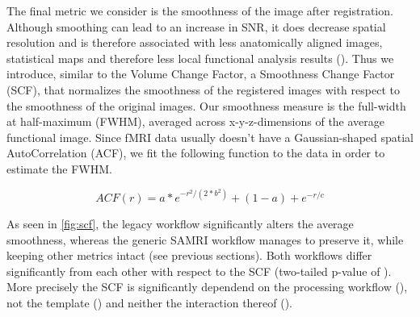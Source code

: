 The final metric we consider is the smoothness of the image after registration. 
Although smoothing can lead to an increase in SNR, it does decrease spatial resolution and is therefore associated with less anatomically aligned images, statistical maps and therefore less local functional analysis results (\cite{esteban2018fmriprep}). 
Thus we introduce, similar to the Volume Change Factor, a Smoothness Change Factor (SCF), that normalizes the smoothness of the registered images with respect to the smoothness of the original images. 
Our smoothness measure is the full-width at half-maximum (FWHM), averaged across x-y-z-dimensions of the average functional image. 
Since fMRI data usually doesn't have a Gaussian-shaped spatial AutoCorrelation (ACF), we fit the following function to the data in order to estimate the FWHM.

\begin{equation} \label{eq:acf}
        ACF(r)
        = a * e^{ -r^{2}/ (2 * b^{2}) } + (1 - a) + e^{-r/c}
\end{equation}

\begin{sansmath}
\end{sansmath}

As seen in \cref{fig:scf}, the legacy workflow significantly alters the average smoothness, whereas the generic SAMRI workflow manages to preserve it, while keeping other metrics intact (see previous sections). 
Both workflows differ significantly from each other with respect to the SCF (two-tailed p-value of ). 
More precisely the SCF is significantly dependend on the processing workflow (), not the template () and neither the interaction thereof ().
